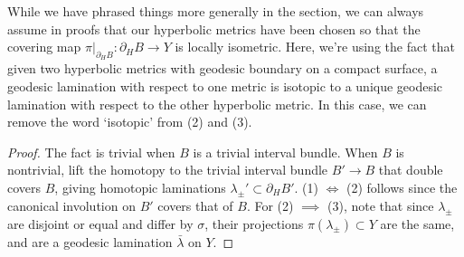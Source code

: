 \documentclass[12pt]{amsart}
\newtheorem{fact}[theorem]{Fact}
\theoremstyle{definition}
\theoremstyle{remark}
\begin{document}
While we have phrased things more generally in the section, we can always assume in proofs that our hyperbolic metrics have been chosen so that the covering map $\pi|_{\partial_HB}: \partial_HB \longrightarrow Y$ is locally isometric. Here, we're using the fact that given two hyperbolic metrics with geodesic boundary on a compact surface, a geodesic lamination with respect to one metric is isotopic to a unique geodesic lamination with respect to the other hyperbolic metric. In this case, we can remove the word `isotopic' from (2) and (3).

\begin {proof}
The fact is trivial when $B$ is a trivial interval bundle. When $B$ is nontrivial, lift the homotopy to the trivial interval bundle $B'\longrightarrow B$ that double covers $B$, giving homotopic laminations $\lambda_\pm' \subset \partial_HB'$. (1) $\iff$ (2) follows since the canonical involution on $B'$ covers that of $B$. For (2) $\implies$ (3), note that since $\lambda_\pm$ are disjoint or equal and differ by $\sigma$, their projections $\pi(\lambda_\pm)\subset Y$ are the same, and are a geodesic lamination $\bar\lambda$ on $Y$.
\end{proof}


%
%
\end{document}
